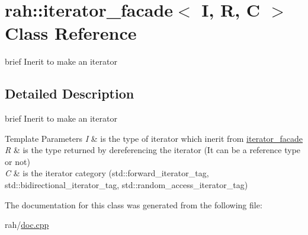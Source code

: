 \hypertarget{classrah_1_1iterator__facade_3_01_i_00_01_r_00_01_c_01_4}{}\section{rah\+::iterator\+\_\+facade$<$ I, R, C $>$ Class Reference}
\label{classrah_1_1iterator__facade_3_01_i_00_01_r_00_01_c_01_4}


brief Inerit to make an iterator  




\subsection{Detailed Description}
brief Inerit to make an iterator 


\begin{DoxyTemplParams}{Template Parameters}
{\em I} & is the type of iterator which inerit from \mbox{\hyperlink{structrah_1_1iterator__facade}{iterator\+\_\+facade}} \\
\hline
{\em R} & is the type returned by dereferencing the iterator (It can be a reference type or not) \\
\hline
{\em C} & is the iterator category (std\+::forward\+\_\+iterator\+\_\+tag, std\+::bidirectional\+\_\+iterator\+\_\+tag, std\+::random\+\_\+access\+\_\+iterator\+\_\+tag) \\
\hline
\end{DoxyTemplParams}


The documentation for this class was generated from the following file\+:\begin{DoxyCompactItemize}
\item 
rah/\mbox{\hyperlink{doc_8cpp}{doc.\+cpp}}\end{DoxyCompactItemize}
